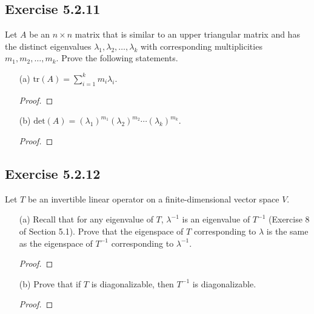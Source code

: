 \subsection*{Exercise 5.2.11} Let \( A  \) be an \( n \times n  \) matrix that is similar to an upper triangular matrix and has the distinct eigenvalues \( {\lambda}_{1}, {\lambda}_{2}, \dots, {\lambda}_{k} \) with corresponding multiplicities \( {m}_{1}, {m}_{2}, \dots, {m}_{k } \). Prove the following statements. 
\begin{enumerate}
    \item[(a)] \( \text{tr}(A) = \sum_{ i=1  }^{ k  } {m}_{i} {\lambda}_{i} \).
        \begin{proof}
        
        \end{proof}
    \item[(b)] \( \text{det}(A) = ({\lambda}_{1})^{{m}_{1}} ({\lambda}_{2})^{{m}_{2}} \cdots ({\lambda}_{k})^{{m}_{k}} \).
        \begin{proof}
        
        \end{proof}
\end{enumerate}

\subsection*{Exercise 5.2.12} Let \( T  \) be an invertible linear operator on a finite-dimensional vector space \( V  \). 
\begin{enumerate}
    \item[(a)] Recall that for any eigenvalue of \( T  \), \( \lambda^{-1} \) is an eigenvalue of \( T^{-1} \) (Exercise 8 of Section 5.1). Prove that the eigenspace of \( T  \) corresponding to \( \lambda  \) is the same as the eigenspace of \( T^{-1} \) corresponding to \( \lambda^{-1} \).
        \begin{proof}
        
        \end{proof}
    \item[(b)] Prove that if \( T  \) is diagonalizable, then \( T^{-1} \) is diagonalizable.
        \begin{proof}
        
        \end{proof}
\end{enumerate}

